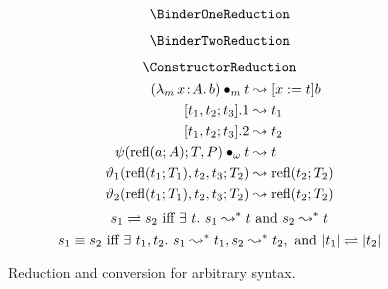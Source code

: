 
\begin{figure}
    \centering
    \begin{minipage}{0.5\textwidth}
        $$\BinderOneReduction$$
    \end{minipage}%
    \begin{minipage}{0.5\textwidth}
        $$\BinderTwoReduction$$
    \end{minipage}
    $$\ConstructorReduction$$
    \begin{align*}
        ({\lambda_m}\, x\! : \! A.\, b) \bullet_{m} t &\leadsto [x := t]b \\
        [t_1, t_2; t_3].1 &\leadsto t_1 \\
        [t_1, t_2; t_3].2 &\leadsto t_2 \\
        \psi(\text{refl}(a; A); T, P) \bullet_{\omega} t &\leadsto t \\
        \vartheta_1(\text{refl}(t_1; T_1), t_2, t_3; T_2) &\leadsto \text{refl}(t_2; T_2) \\
        \vartheta_2(\text{refl}(t_1; T_1), t_2, t_3; T_2) &\leadsto \text{refl}(t_2; T_2) \\
    \end{align*}
    \vspace{-.4in}
    $$s_1 \rightleftharpoons s_2 \text{ iff } \exists\ t.\ s_1 \leadsto^* t \text{ and } s_2 \leadsto^* t$$
    $$s_1 \equiv s_2 \text{ iff } \exists\ t_1, t_2.\ s_1 \leadsto^* t_1, s_2 \leadsto^* t_2, \text{ and } |t_1| \rightleftharpoons |t_2|$$
    \caption{Reduction and conversion for arbitrary syntax.}
    \label{fig:reduction}
\end{figure}


